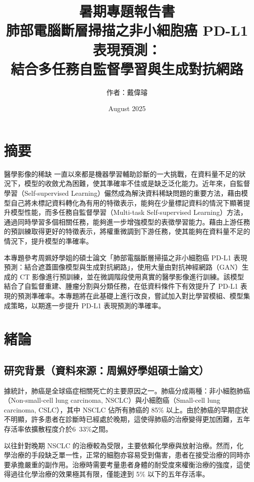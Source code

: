 \documentclass[12pt,a4paper]{article}
\title{暑期專題報告書\\\large 肺部電腦斷層掃描之非小細胞癌 PD-L1 表現預測：\\結合多任務自監督學習與生成對抗網路}
\author{作者：戴偉璿}
\date{August 2025}
\begin{document}

\maketitle

\newpage
\tableofcontents
\newpage

\section*{摘要}

醫學影像的稀缺 一直以來都是機器學習輔助診斷的一大挑戰，在資料量不足的狀況下，模型的收斂尤為困難，使其準確率不佳或是缺乏泛化能力。近年來，自監督學習（Self-supervised Learning）儼然成為解決資料稀缺問題的重要方法，藉由模型自己將未標記資料轉化為有用的特徵表示，能夠在少量標記資料的情況下顯著提升模型性能，而多任務自監督學習（Multi-task Self-supervised Learning）方法，通過同時學習多個相關任務，能夠進一步增強模型的表徵學習能力。藉由上游任務的預訓練取得更好的特徵表示，將權重微調到下游任務，使其能夠在資料量不足的情況下，提升模型的準確率。

本專題參考周姵妤學姐的碩士論文「肺部電腦斷層掃描之非小細胞癌 PD-L1 表現預測：結合遮蓋圖像模型與生成對抗網路」，使用大量由對抗神經網路（GAN）生成的 CT 影像進行預訓練，並在微調階段使用真實的醫學影像進行訓練。該模型結合了自監督重建、腫瘤分割與分類任務，在低資料條件下有效提升了 PD-L1 表現的預測準確率。本專題將在此基礎上進行改良，嘗試加入對比學習模組、模型集成策略，以期進一步提升 PD-L1 表現預測的準確率。

\section{緒論}

\subsection{研究背景（資料來源：周姵妤學姐碩士論文）}

據統計，肺癌是全球癌症相關死亡的主要原因之一。肺癌分成兩種：非小細胞肺癌（Non-small-cell lung carcinoma, NSCLC）與小細胞癌（Small-cell lung carcinoma, CSLC），其中 NSCLC 佔所有肺癌的 85\% 以上。由於肺癌的早期症狀不明顯，許多患者在診斷時已經處於晚期，這使得肺癌的治療變得更加困難，五年存活率依擴散程度介於6~33\%之間。

以往針對晚期 NSCLC 的治療較為受限，主要依賴化學療與放射治療。然而，化學治療的手段缺乏單一性，正常的細胞亦容易受到傷害，患者在接受治療的同時亦要承擔嚴重的副作用。治療時需要考量患者身體的耐受度來權衡治療的強度，這使得過往化學治療的效果極其有限，僅能達到 5\% 以下的五年存活率。
\end{document}
